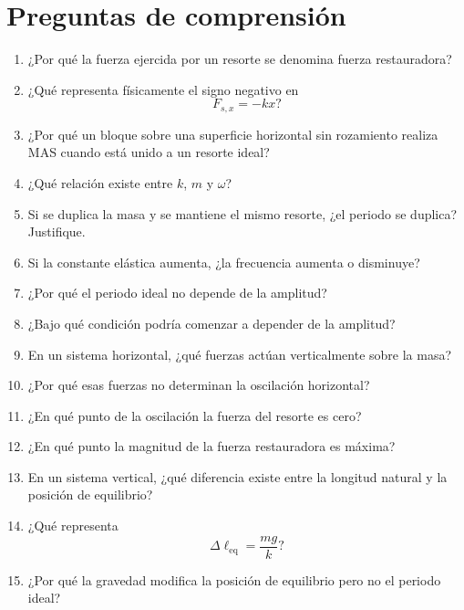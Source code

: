 \section{Preguntas de comprensión}

\begin{enumerate}
    \item ¿Por qué la fuerza ejercida por un resorte se denomina fuerza restauradora?

    \item ¿Qué representa físicamente el signo negativo en
    \[ F_{s,x}=-kx? \]

    \item ¿Por qué un bloque sobre una superficie horizontal sin rozamiento realiza MAS cuando está unido a un resorte ideal?

    \item ¿Qué relación existe entre \(k\), \(m\) y \(\omega\)?

    \item Si se duplica la masa y se mantiene el mismo resorte, ¿el periodo se duplica? Justifique.

    \item Si la constante elástica aumenta, ¿la frecuencia aumenta o disminuye?

    \item ¿Por qué el periodo ideal no depende de la amplitud?

    \item ¿Bajo qué condición podría comenzar a depender de la amplitud?

    \item En un sistema horizontal, ¿qué fuerzas actúan verticalmente sobre la masa?

    \item ¿Por qué esas fuerzas no determinan la oscilación horizontal?

    \item ¿En qué punto de la oscilación la fuerza del resorte es cero?

    \item ¿En qué punto la magnitud de la fuerza restauradora es máxima?

    \item En un sistema vertical, ¿qué diferencia existe entre la longitud natural y la posición de equilibrio?

    \item ¿Qué representa
    \[ \Delta\ell_{\mathrm{eq}}=\frac{mg}{k}? \]

    \item ¿Por qué la gravedad modifica la posición de equilibrio pero no el periodo ideal?


\end{enumerate}
